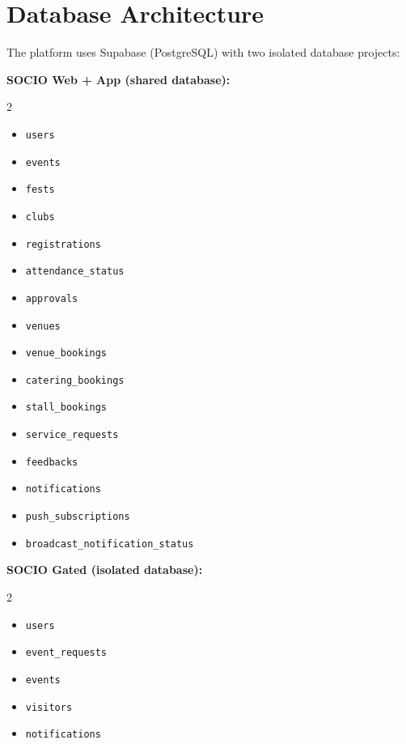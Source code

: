 \documentclass[12pt,a4paper]{article}
\begin{document}
\newpage
\section{Database Architecture}

The platform uses Supabase (PostgreSQL) with two isolated database projects:

\textbf{SOCIO Web + App (shared database):}
\begin{multicols}{2}
\begin{itemize}[leftmargin=*]
    \item \texttt{users}
    \item \texttt{events}
    \item \texttt{fests}
    \item \texttt{clubs}
    \item \texttt{registrations}
    \item \texttt{attendance\_status}
    \item \texttt{approvals}
    \item \texttt{venues}
    \item \texttt{venue\_bookings}
    \item \texttt{catering\_bookings}
    \item \texttt{stall\_bookings}
    \item \texttt{service\_requests}
    \item \texttt{feedbacks}
    \item \texttt{notifications}
    \item \texttt{push\_subscriptions}
    \item \texttt{broadcast\_notification\_status}
\end{itemize}
\end{multicols}

\textbf{SOCIO Gated (isolated database):}
\begin{multicols}{2}
\begin{itemize}[leftmargin=*]
    \item \texttt{users}
    \item \texttt{event\_requests}
    \item \texttt{events}
    \item \texttt{visitors}
    \item \texttt{notifications}
\end{itemize}
\end{multicols}
\end{document}
